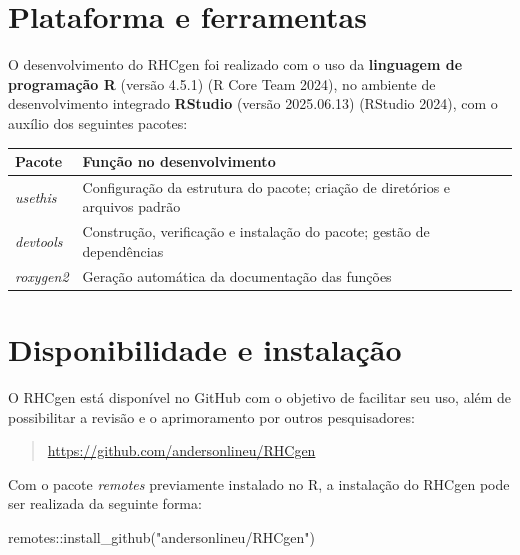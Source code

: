 \documentclass[
  brazilian,
  a4paper,
  oneside]{scrbook}
\newenvironment{Shaded}{\begin{snugshade}}{\end{snugshade}}
\newcommand{\FunctionTok}[1]{\textcolor[rgb]{0.28,0.35,0.67}{#1}}
\newcommand{\NormalTok}[1]{\textcolor[rgb]{0.00,0.23,0.31}{#1}}
\newcommand{\SpecialCharTok}[1]{\textcolor[rgb]{0.37,0.37,0.37}{#1}}
\newcommand{\StringTok}[1]{\textcolor[rgb]{0.13,0.47,0.30}{#1}}
\newcounter{none} %
\begin{document}
\section{Plataforma e ferramentas}\label{plataforma-e-ferramentas}

O desenvolvimento do RHCgen foi realizado com o uso da \textbf{linguagem
de programação R} (versão 4.5.1) (R Core Team 2024), no ambiente de
desenvolvimento integrado \textbf{RStudio} (versão 2025.06.13) (RStudio
2024), com o auxílio dos seguintes pacotes:

{\def\LTcaptype{none} %
\begin{longtable}[]{@{}
  >{\raggedright\arraybackslash}p{}
  >{\raggedright\arraybackslash}p{}@{}}
\toprule\noalign{}
\begin{minipage}[b]{\linewidth}\raggedright
Pacote
\end{minipage} & \begin{minipage}[b]{\linewidth}\raggedright
Função no desenvolvimento
\end{minipage} \\
\midrule\noalign{}
\endhead
\bottomrule\noalign{}
\endlastfoot
\emph{usethis} & Configuração da estrutura do pacote; criação de
diretórios e arquivos padrão \\
\emph{devtools} & Construção, verificação e instalação do pacote; gestão
de dependências \\
\emph{roxygen2} & Geração automática da documentação das funções \\
\end{longtable}
}

\section{Disponibilidade e
instalação}\label{disponibilidade-e-instalauxe7uxe3o}

O RHCgen está disponível no GitHub com o objetivo de facilitar seu uso,
além de possibilitar a revisão e o aprimoramento por outros
pesquisadores:

\begin{quote}
\url{https://github.com/andersonlineu/RHCgen}
\end{quote}

Com o pacote \emph{remotes} previamente instalado no R, a instalação do
RHCgen pode ser realizada da seguinte forma:

\begin{Shaded}
\begin{Highlighting}[]
\NormalTok{remotes}\SpecialCharTok{::}\FunctionTok{install\_github}\NormalTok{(}\StringTok{"andersonlineu/RHCgen"}\NormalTok{)}
\end{Highlighting}
\end{Shaded}
\end{document}
